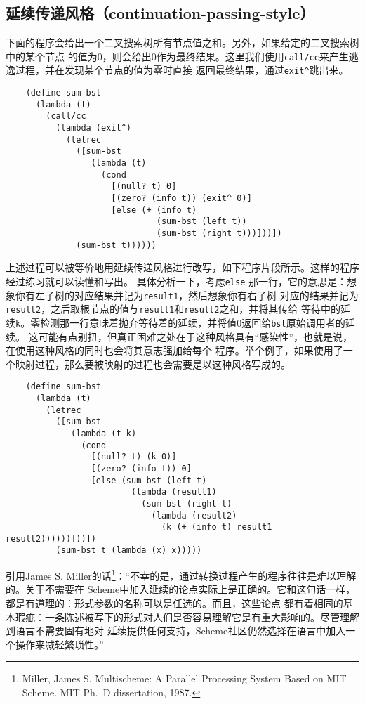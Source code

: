 \documentclass[12pt]{article}
\begin{document}
\subsection{延续传递风格（continuation-passing-style）}
\indent{}下面的程序会给出一个二叉搜索树所有节点值之和。另外，如果给定的二叉搜索树中的某个节点
的值为0，则会给出0作为最终结果。这里我们使用\texttt{call/cc}来产生逃逸过程，并在发现某个节点的值为零时直接
返回最终结果，通过\texttt{exit\^{}}跳出来。
\begin{verbatim}
    (define sum-bst
      (lambda (t)
        (call/cc
          (lambda (exit^)
            (letrec
              ([sum-bst
                 (lambda (t)
                   (cond
                     [(null? t) 0]
                     [(zero? (info t)) (exit^ 0)]
                     [else (+ (info t)
                              (sum-bst (left t))
                              (sum-bst (right t)))]))])
              (sum-bst t))))))
\end{verbatim}
\indent{}上述过程可以被等价地用延续传递风格进行改写，如下程序片段所示。这样的程序经过练习就可以读懂和写出。
具体分析一下，考虑\texttt{else} 那一行，它的意思是：想象你有左子树的对应结果并记为\texttt{result1}，然后想象你有右子树
对应的结果并记为\texttt{result2}，之后取根节点的值与\texttt{result1}和\texttt{result2}之和，并将其传给
等待中的延续\texttt{k}。零检测那一行意味着抛弃等待着的延续，并将值0返回给\texttt{bst}原始调用者的延续。
这可能有点别扭，但真正困难之处在于这种风格具有“感染性”，也就是说，在使用这种风格的同时也会将其意志强加给每个
程序。举个例子，如果使用了一个映射过程，那么要被映射的过程也会需要是以这种风格写成的。
\begin{verbatim}
    (define sum-bst
      (lambda (t)
        (letrec
          ([sum-bst
             (lambda (t k)
               (cond
                 [(null? t) (k 0)]
                 [(zero? (info t)) 0]
                 [else (sum-bst (left t)
                         (lambda (result1)
                           (sum-bst (right t)
                             (lambda (result2)
                               (k (+ (info t) result1 result2))))))]))])
          (sum-bst t (lambda (x) x)))))
\end{verbatim}
\indent{}引用James S. Miller的话\footnote{Miller, James S. Multischeme: A Parallel Processing System
Based on MIT Scheme. MIT Ph.~D dissertation, 1987.}：“不幸的是，通过转换过程产生的程序往往是难以理解的。关于不需要在
Scheme中加入延续的论点实际上是正确的。它和这句话一样，都是有道理的：形式参数的名称可以是任选的。而且，这些论点
都有着相同的基本瑕疵：一条陈述被写下的形式对人们是否容易理解它是有重大影响的。尽管理解到语言不需要固有地对
延续提供任何支持，Scheme社区仍然选择在语言中加入一个操作来减轻繁琐性。”
\end{document}
